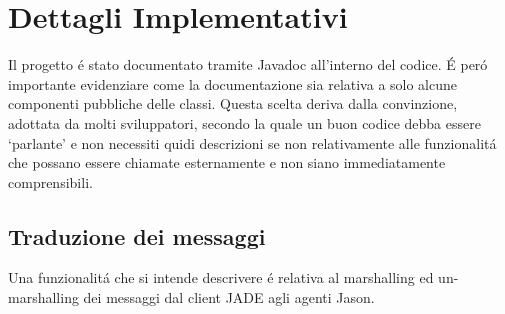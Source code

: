 \section{Dettagli Implementativi}


Il progetto \'e stato documentato tramite Javadoc all'interno del codice. \'E per\'o importante evidenziare come la documentazione sia relativa a solo alcune componenti pubbliche delle classi. Questa scelta deriva dalla convinzione, adottata da molti sviluppatori, secondo la quale un buon codice debba essere `parlante' e non necessiti quidi descrizioni se non relativamente alle funzionalit\'a che possano essere chiamate esternamente e non siano immediatamente comprensibili.

\subsection{Traduzione dei messaggi}
Una funzionalit\'a che si intende descrivere \'e relativa al marshalling ed un-marshalling dei messaggi dal client JADE agli agenti Jason.


